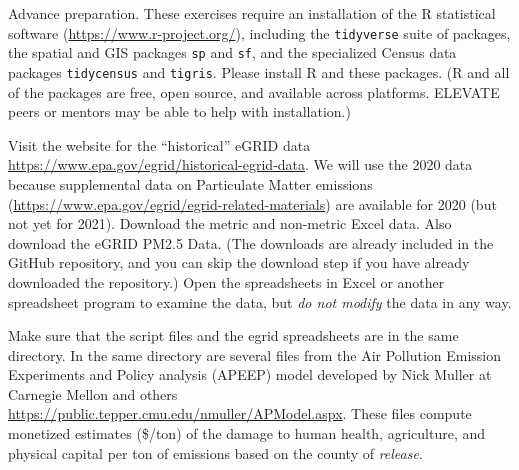 \documentclass[fleqn, 12pt]{exam}
\begin{document}
  \begin{questions}
    
  \question Advance preparation. These exercises require an installation of the R statistical software (\url{https://www.r-project.org/}), including the \texttt{tidyverse} suite of packages, the spatial and GIS packages \texttt{sp} and \texttt{sf}, and the specialized Census data packages \texttt{tidycensus} and \texttt{tigris}.  Please install R and these packages. (R and all of the packages are free, open source, and available across platforms. ELEVATE peers or mentors may be able to help with installation.) 

\question Visit the website for the ``historical'' eGRID data \url{https://www.epa.gov/egrid/historical-egrid-data}.  We will use the 2020 data because supplemental data on Particulate Matter emissions (\url{https://www.epa.gov/egrid/egrid-related-materials}) are available for 2020 (but not yet for 2021).  Download the metric and non-metric Excel data.  Also download the eGRID PM2.5 Data.  (The downloads are already included in the GitHub repository, and you can skip the download step if you have already downloaded the repository.) Open the spreadsheets in Excel or another spreadsheet program to examine the data, but \emph{do not modify} the data in any way.

    
  \question Make sure that the script files and the egrid spreadsheets are in the same directory. In the same directory are several files from the Air Pollution Emission Experiments and Policy analysis (APEEP) model developed by Nick Muller at Carnegie Mellon and others  \url{https://public.tepper.cmu.edu/nmuller/APModel.aspx}. These files compute monetized estimates (\$/ton) of the damage to human health, agriculture, and physical capital per ton of emissions based on the county of \emph{release}.


\end{questions}
\end{document}
